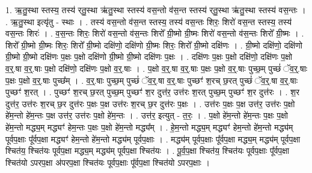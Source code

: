 \documentclass[17pt]{extarticle}
\begin{document}
1. ऋ॒तु॒स्था स्तस्य॒ तस्य॑ र्‌तु॒स्था ऋ॑तु॒स्था स्तस्य॑ वस॒न्तो व॑स॒न्त स्तस्य॑ र्‌तु॒स्था ऋ॑तु॒स्था स्तस्य॑ वस॒न्तः । . ऋ॒तु॒स्था इत्यृ॑तु - स्थाः । . तस्य॑ वस॒न्तो व॑स॒न्त स्तस्य॒ तस्य॑ वस॒न्तः शिरः॒ शिरो॑ वस॒न्त स्तस्य॒ तस्य॑ वस॒न्तः शिरः॑ । . व॒स॒न्तः शिरः॒ शिरो॑ वस॒न्तो व॑स॒न्तः शिरो᳚ ग्री॒ष्मो ग्री॒ष्मः शिरो॑ वस॒न्तो व॑स॒न्तः शिरो᳚ ग्री॒ष्मः । . शिरो᳚ ग्री॒ष्मो ग्री॒ष्मः शिरः॒ शिरो᳚ ग्री॒ष्मो दक्षि॑णो॒ दक्षि॑णो ग्री॒ष्मः शिरः॒ शिरो᳚ ग्री॒ष्मो दक्षि॑णः । . ग्री॒ष्मो दक्षि॑णो॒ दक्षि॑णो ग्री॒ष्मो ग्री॒ष्मो दक्षि॑णः प॒क्षः प॒क्षो दक्षि॑णो ग्री॒ष्मो ग्री॒ष्मो दक्षि॑णः प॒क्षः । . दक्षि॑णः प॒क्षः प॒क्षो दक्षि॑णो॒ दक्षि॑णः प॒क्षो व॒र्॒.षा व॒र्॒.षाः प॒क्षो दक्षि॑णो॒ दक्षि॑णः प॒क्षो व॒र्॒.षाः । . प॒क्षो व॒र्॒.षा व॒र्॒.षाः प॒क्षः प॒क्षो व॒र्॒.षाः पुच्छ॒म् पुच्छं॑ ॅव॒र्॒.षाः प॒क्षः प॒क्षो व॒र्॒.षाः पुच्छ᳚म् । . व॒र्॒.षाः पुच्छ॒म् पुच्छं॑ ॅव॒र्॒.षा व॒र्॒.षाः पुच्छꣳ॑ श॒रच् छ॒रत् पुच्छं॑ ॅव॒र्॒.षा व॒र्॒.षाः पुच्छꣳ॑ श॒रत् । . पुच्छꣳ॑ श॒रच् छ॒रत् पुच्छ॒म् पुच्छꣳ॑ श॒र दुत्त॑र॒ उत्त॑रः श॒रत् पुच्छ॒म् पुच्छꣳ॑ श॒र दुत्त॑रः । . श॒र दुत्त॑र॒ उत्त॑रः श॒रच् छ॒र दुत्त॑रः प॒क्षः प॒क्ष उत्त॑रः श॒रच् छ॒र दुत्त॑रः प॒क्षः । . उत्त॑रः प॒क्षः प॒क्ष उत्त॑र॒ उत्त॑रः प॒क्षो हे॑म॒न्तो हे॑म॒न्तः प॒क्ष उत्त॑र॒ उत्त॑रः प॒क्षो हे॑म॒न्तः । . उत्त॑र॒ इत्युत् - त॒रः॒ । . प॒क्षो हे॑म॒न्तो हे॑म॒न्तः प॒क्षः प॒क्षो हे॑म॒न्तो मद्ध्य॒म् मद्ध्यꣳ॑ हेम॒न्तः प॒क्षः प॒क्षो हे॑म॒न्तो मद्ध्य᳚म् । . हे॒म॒न्तो मद्ध्य॒म् मद्ध्यꣳ॑ हेम॒न्तो हे॑म॒न्तो मद्ध्य॑म् पूर्वप॒क्षाः पू᳚र्वप॒क्षा मद्ध्यꣳ॑ हेम॒न्तो हे॑म॒न्तो मद्ध्य॑म् पूर्वप॒क्षाः । . मद्ध्य॑म् पूर्वप॒क्षाः पू᳚र्वप॒क्षा मद्ध्य॒म् मद्ध्य॑म् पूर्वप॒क्षा श्चित॑य॒ श्चित॑यः पूर्वप॒क्षा मद्ध्य॒म् मद्ध्य॑म् पूर्वप॒क्षा श्चित॑यः । . पू॒र्व॒प॒क्षा श्चित॑य॒ श्चित॑यः पूर्वप॒क्षाः पू᳚र्वप॒क्षा श्चित॑यो ऽपरप॒क्षा अ॑परप॒क्षा श्चित॑यः पूर्वप॒क्षाः पू᳚र्वप॒क्षा श्चित॑यो ऽपरप॒क्षाः । \newline
\end{document}

